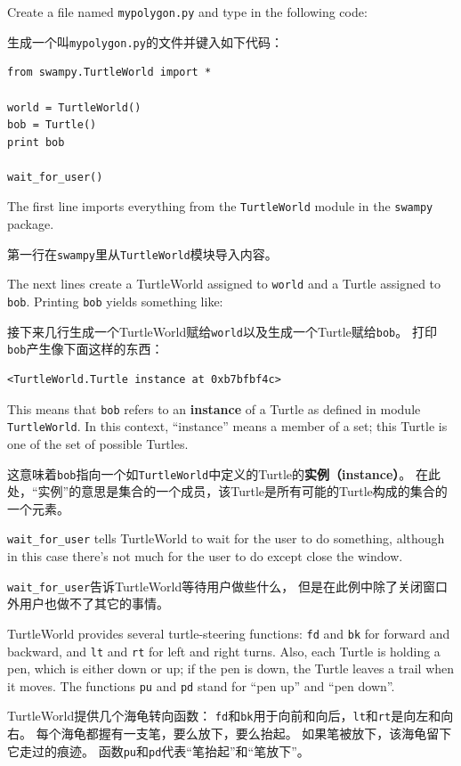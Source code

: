 \documentclass[10pt]{book}
\begin{document}
\begin{CJK}{UTF8}{gbsn}
Create a file named {\tt mypolygon.py} and type in the following
code:

生成一个叫{\tt mypolygon.py}的文件并键入如下代码：

\begin{verbatim}
from swampy.TurtleWorld import *

world = TurtleWorld()
bob = Turtle()
print bob

wait_for_user()
\end{verbatim}
%
The first line imports everything from the {\tt TurtleWorld} module
in the {\tt swampy} package.

第一行在{\tt swampy}里从{\tt TurtleWorld}模块导入内容。

The next lines create a TurtleWorld assigned to {\tt world} and
a Turtle assigned to {\tt bob}.  Printing {\tt bob} yields something
like:

接下来几行生成一个TurtleWorld赋给{\tt world}以及生成一个Turtle赋给{\tt bob}。
打印{\tt bob}产生像下面这样的东西：

\begin{verbatim}
<TurtleWorld.Turtle instance at 0xb7bfbf4c>
\end{verbatim}
%
This means that {\tt bob} refers to
an {\bf instance} of a Turtle
as defined in module {\tt TurtleWorld}.  In this context,
``instance'' means a member of a set;
this Turtle is one of the set of possible Turtles.

这意味着{\tt bob}指向一个如{\tt TurtleWorld}中定义的Turtle的{\bf 实例（instance）}。
在此处，``实例''的意思是集合的一个成员，该Turtle是所有可能的Turtle构成的集合的一个元素。

\verb"wait_for_user" tells TurtleWorld to wait for the user
to do something, although in this case there's not much for
the user to do except close the window.

\verb"wait_for_user"告诉TurtleWorld等待用户做些什么，
但是在此例中除了关闭窗口外用户也做不了其它的事情。

TurtleWorld provides several
turtle-steering functions: {\tt fd} and {\tt bk} for
forward and backward, and {\tt lt} and {\tt rt} for left and
right turns.  Also, each Turtle is holding a pen, which is
either down or up; if the pen is down, the Turtle leaves
a trail when it moves.  The functions {\tt pu} and {\tt pd}
stand for ``pen up'' and ``pen down''.

TurtleWorld提供几个海龟转向函数：
{\tt fd}和{\tt bk}用于向前和向后，{\tt lt}和{\tt rt}是向左和向右。
每个海龟都握有一支笔，要么放下，要么抬起。
如果笔被放下，该海龟留下它走过的痕迹。
函数{\tt pu}和{\tt pd}代表``笔抬起''和``笔放下''。


\end{CJK}
\end{document}
